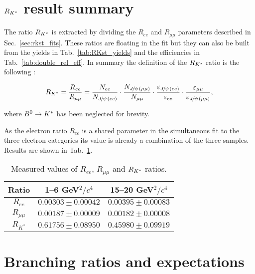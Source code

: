 \section{$R_{{{K}^*}}$ result summary}

The ratio $R_{{{K}^*}}$ is extracted by dividing the $R_{ee}$ and $R_{\mu\mu}$
parameters described in Sec.~\ref{sec:rkst_fits}. These ratios are 
floating in the fit but they can also be built from the yields
in Tab.~\ref{tab:RKst_yields} and the efficiencies in Tab.~\ref{tab:double_rel_eff}.
In summary the definition of the $R_{{{K}^*}}$ ratio is the following :

\begin{equation}
R_{\Kstar} = \frac{R_{ee}}{R_{\mu\mu}}  
= \frac{N_{ee}}{N_{\jpsi(ee)}} 
\cdot \frac{N_{\jpsi(\mu\mu)}}{N_{\mu\mu}}
\cdot \frac{\varepsilon_{\jpsi(ee)}}{\varepsilon_{ee}} 
\cdot \frac{\varepsilon_{\mu\mu}}{\varepsilon_{\jpsi(\mu\mu)}},
\end{equation}

where ${{B}^0}\rightarrow{\ensuremath{{K}^*}}$ has been neglected for brevity.

As the electron ratio $R_{ee}$ is a shared parameter in the simultaneous fit to the
three electron categories its value is already a combination of the three samples.
Results are shown in Tab.~\ref{tab:RKst_results}.

\begin{table}
\centering
\begin{tabular}{|c|c|c|}
\hline
 Ratio 			& 1--6 GeV$^2/c^4$ & 15--20 GeV$^2/c^4$\\ \hline
 $R_{ee}$ 	& $ 0.00303  \pm  0.00042 $ 	& $ 0.00395  \pm  0.00083 $ \\
 $R_{\mu\mu}$ 	& $ 0.00187  \pm  0.00009 $ 	& $ 0.00182  \pm  0.00008 $ \\
\hline $R_{K^*}$ 	& $ 0.61756  \pm  0.08950 $ 	& $ 0.45980  \pm  0.09919 $ \\
\hline 
 \end{tabular}
 \caption{Measured values of $R_{ee}$, $R_{\mu\mu}$ and $R_{{{K}^*}}$ ratios.}
 \label{tab:RKst_results}
\end{table}

\section{Branching ratios and expectations}

